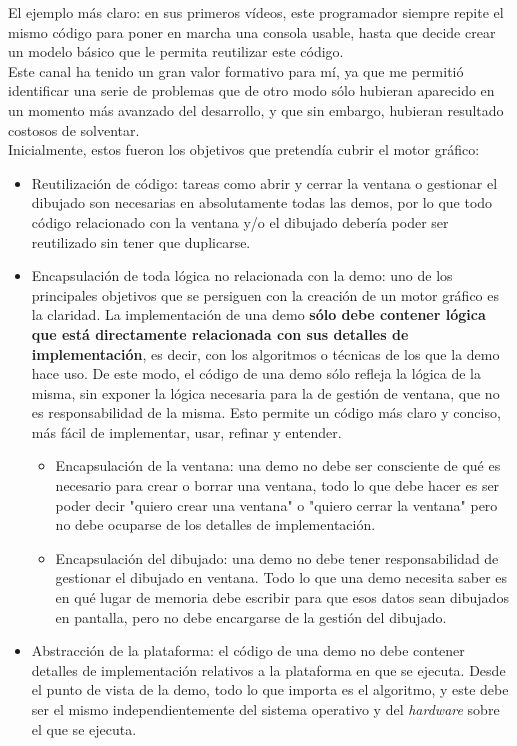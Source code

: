 El ejemplo más claro: en sus primeros vídeos, este programador siempre repite el mismo código para poner en marcha una consola usable, hasta que decide crear un modelo básico que le permita reutilizar este código.\\

Este canal ha tenido un gran valor formativo para mí, ya que me permitió identificar una serie de problemas que de otro modo sólo hubieran aparecido en un momento más avanzado del desarrollo, y que sin embargo, hubieran resultado costosos de solventar.\\

Inicialmente, estos fueron los objetivos que pretendía cubrir el motor gráfico:
\begin{itemize}
	\item Reutilización de código: tareas como abrir y cerrar la ventana o gestionar el dibujado son necesarias en absolutamente todas las demos, por lo que todo código relacionado con la ventana y/o el dibujado debería poder ser reutilizado sin tener que duplicarse.
	\item Encapsulación de toda lógica no relacionada con la demo: uno de los principales objetivos que se persiguen con la creación de un motor gráfico es la claridad. La implementación de una demo \textbf{sólo debe contener lógica que está directamente relacionada con sus detalles de implementación}, es decir, con los algoritmos o técnicas de los que la demo hace uso. De este modo, el código de una demo sólo refleja la lógica de la misma, sin exponer la lógica necesaria para la de gestión de ventana, que no es responsabilidad de la misma. Esto permite un código más claro y conciso, más fácil de implementar, usar, refinar y entender.
		\begin{itemize}
			\item Encapsulación de la ventana: una demo no debe ser consciente de qué es necesario para crear o borrar una ventana, todo lo que debe hacer es ser poder decir "quiero crear una ventana" o "quiero cerrar la ventana" pero no debe ocuparse de los detalles de implementación.
			\item Encapsulación del dibujado: una demo no debe tener responsabilidad de gestionar el dibujado en ventana. Todo lo que una demo necesita saber es en qué lugar de memoria debe escribir para que esos datos sean dibujados en pantalla, pero no debe encargarse de la gestión del dibujado.
		\end{itemize}
	\item Abstracción de la plataforma: el código de una demo no debe contener detalles de implementación relativos a la plataforma en que se ejecuta. Desde el punto de vista de la demo, todo lo que importa es el algoritmo, y este debe ser el mismo independientemente del sistema operativo y del \emph{hardware} sobre el que se ejecuta.
\end{itemize}

